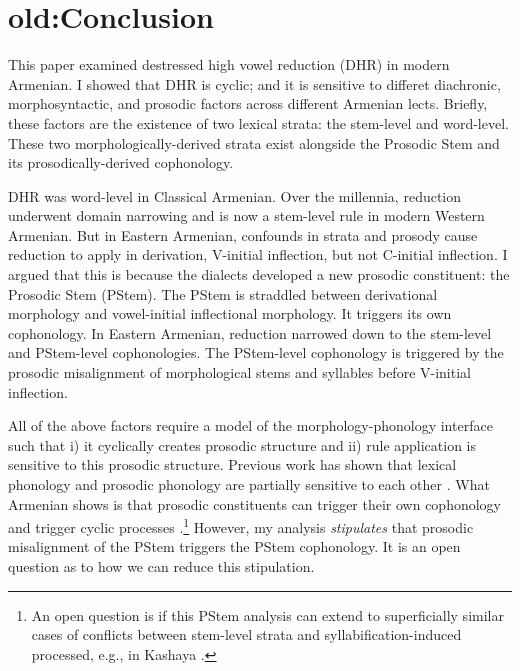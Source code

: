 \section{old:Conclusion}\label{nlttPapersection: reduction: conclusion}
This paper examined destressed high vowel reduction (DHR) in modern Armenian. I showed that DHR is cyclic; and it is sensitive to differet diachronic, morphosyntactic, and prosodic factors across different Armenian lects. Briefly, these factors are the existence of two lexical strata: the stem-level and word-level. These two morphologically-derived strata exist alongside the Prosodic Stem and its prosodically-derived cophonology.

DHR was word-level in Classical Armenian. Over the millennia, reduction underwent domain narrowing and is now a stem-level rule in modern Western Armenian. But in Eastern Armenian, confounds in strata and prosody cause reduction to apply in derivation, V-initial inflection, but not C-initial inflection. I argued that this is because the dialects developed a new prosodic constituent: the Prosodic Stem (PStem). The PStem is straddled between derivational morphology and vowel-initial inflectional morphology. It triggers its own cophonology. In Eastern Armenian, reduction narrowed down to the stem-level and PStem-level cophonologies. The PStem-level cophonology is triggered by the prosodic misalignment of morphological stems and syllables before V-initial inflection. 


All of the above factors require a model of the morphology-phonology interface such that i) it cyclically creates prosodic structure and ii) rule application is sensitive to this prosodic structure. Previous work has shown that lexical phonology and prosodic phonology are partially sensitive to each other \citep{BooijRubach-1984-MorphoProsoLexicalPhonology,Nespor-Vogel-1986-ProsodicPhon,Szpyra-1989-PhonoMorphoInterface,Cohn-1989-StressIndonesian,Inkelas-1989-ProsodicLexicon,Inkelas-1993-DerivingCyclicity,BooijLieber-1993-SimultaenousMorphoProsodicStructure,Hall-1999-PhonologicalWord}. What Armenian shows is that prosodic constituents can trigger their own cophonology and trigger cyclic processes \citep[cf.][]{Mansfield-2017-PWordsCyclicDerivationMurrinhpatha}.\footnote{An open question is if this PStem analysis can extend to superficially similar cases of conflicts between stem-level strata and syllabification-induced processed, e.g., in Kashaya \citep{buckley-2016-globalStructureEffectsKashayaProsodicStructure}.} However, my analysis \textit{stipulates} that prosodic misalignment of the PStem triggers the PStem cophonology. It is an open question as to how we can reduce this stipulation. 








